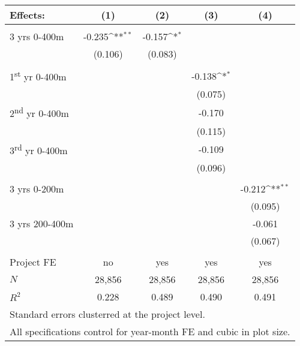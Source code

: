{
\def\sym#1{\ifmmode^{#1}\else\(^{#1}\)\fi}
\begin{tabular}{l*{4}{c}}
Effects: & (1) & (2) & (3) & (4) \\[0.2em]
\hline\\[-0.9em]

3 yrs 0-400m                     &   -0.235\sym{**} &   -0.157\sym{*}  &                  &           \\
                                 &  (0.106)         &  (0.083)         &                  &           \\
[0.2em]\hline \\[-0.9em]

1\textsuperscript{st} yr 0-400m  &                  &                  &   -0.138\sym{*}  &           \\
                                 &                  &                  &  (0.075)         &           \\

2\textsuperscript{nd} yr 0-400m  &                  &                  &   -0.170         &           \\
                                 &                  &                  &  (0.115)         &           \\

3\textsuperscript{rd} yr 0-400m  &                  &                  &   -0.109         &           \\
                                 &                  &                  &  (0.096)         &           \\[0.2em]
\hline\\[-0.9em]

3 yrs 0-200m                     &                  &                  &                  &   -0.212\sym{**} \\
                                 &                  &                  &                  &  (0.095)         \\

3 yrs 200-400m                   &                  &                  &                  &   -0.061         \\
                                 &                  &                  &                  &  (0.067)         \\[0.2em]
\hline \\[-0.9em]
Project FE                       &     no           &    yes           &      yes         &      yes         \\    
\(N\)                            &    28,856        &   28,856         &    28,856        &    28,856         \\
\(R^{2}\)                        &    0.228         &    0.489         &    0.490         &    0.491         \\
\hline
\multicolumn{5}{l}{\tiny Standard errors clusterred at the project level.} \\[-.4em]
\multicolumn{5}{l}{\tiny All specifications control for year-month FE and cubic in plot size.}
\end{tabular}
}
